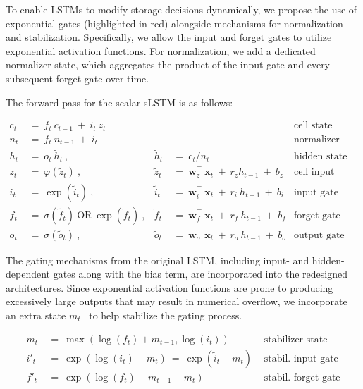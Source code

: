 To enable LSTMs to modify storage decisions dynamically, we propose the use of exponential gates (highlighted in red) alongside mechanisms for normalization and stabilization. Specifically, we allow the input and forget gates to utilize exponential activation functions. For normalization, we add a dedicated normalizer state, which aggregates the product of the input gate and every subsequent forget gate over time.

The forward pass for the scalar sLSTM is as follows:

\begin{align}
\label{eq:slstmforward}
c_t \ &= \  f_t \ c_{t-1} \ + \ i_t \ z_t & & 
 &\text{cell state} \\
n_t \ &= \  f_t \ n_{t-1} \ + \ i_t  & & 
 &\text{normalizer state} \\
h_t \ &= \ o_t \ \tilde{h}_t \ ,
  &\tilde{h}_t \ &= \ c_t / n_t
&\text{hidden state} \\
z_t \ &= \ \varphi \left( \tilde{z}_t \right) \ , 
  &\tilde{z}_t \ &=  \ \mathbf{w}^\top_{z} \ \mathbf{x}_t \ + \
  r_{z}  h_{t-1} \ + \  b_{z}
  &\text{cell input} \\
i_t \ &= \ \!\exp \left( \tilde{i}_t  \right) \ , 
  &\tilde{i}_t \ &= \ \mathbf{w}^\top_{i} \ \mathbf{x}_t \ + \
  r_{i}  \ h_{t-1} \ + \  b_{i}
  &\text{input gate} \\
f_t \ &= \ \sigma \left(  \tilde{f}_t \right) \ \text{OR} \
\!\exp \left(  \tilde{f}_t \right) \ ,
  &\tilde{f}_t \ &= \ \mathbf{w}^\top_{f} \ \mathbf{x}_t  \ + \
  r_{f}  \ h_{t-1} \ + \  b_{f}
  &\text{forget gate} \\
o_t \ &= \ \sigma \left( \tilde{o}_t \right) \ , 
  &\tilde{o}_t  \ &= \ \mathbf{w}^\top_{o} \ \mathbf{x}_t \ + \
  r_{o}  \ h_{t-1} \ + \  b_{o}
  &\text{output gate} 
\end{align}

The gating mechanisms from the original LSTM, including input- and hidden-dependent gates along with the bias term, are incorporated into the redesigned architectures. Since exponential activation functions are prone to producing excessively large outputs that may result in numerical overflow, we incorporate an extra state \mbox{$m_t$~\citep{Milakov:18arxiv}} to help stabilize the gating process.

\begin{align}
\label{eq:slstmstabil}
m_t \ &= \ \max \left( \log ( f_t ) + m_{t-1} , \log ( i_t ) \right) &\text{stabilizer state} \\
i'_t \ &= \ \!\exp \left( \log \left ( i_t \right) - m_t \right) \ = \ \!\exp \left( \tilde{i}_t - m_t \right) \ \, 
  &\text{stabil. input gate} \\
f'_t \ &= \ \!\exp \left( \log \left( f_t \right) + m_{t-1} - m_t \right) \ \, 
  &\text{stabil. forget gate}
\end{align}

